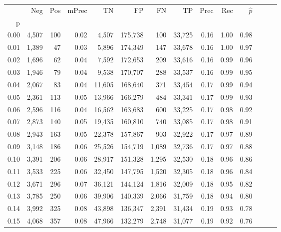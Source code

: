 \begin{tabular}{rrrrrrrrrrrrrr}
\toprule
{} &    Neg &  Pos & mPrec &       TN &       FP &      FN &      TP &  Prec &   Rec & $\hat{p}$ \\
p    &        &      &       &          &          &         &         &       &       &           \\
\midrule
0.00 &  4,507 &  100 &  0.02 &    4,507 &  175,738 &     100 &  33,725 &  0.16 &  1.00 &      0.98 \\
0.01 &  1,389 &   47 &  0.03 &    5,896 &  174,349 &     147 &  33,678 &  0.16 &  1.00 &      0.97 \\
0.02 &  1,696 &   62 &  0.04 &    7,592 &  172,653 &     209 &  33,616 &  0.16 &  0.99 &      0.96 \\
0.03 &  1,946 &   79 &  0.04 &    9,538 &  170,707 &     288 &  33,537 &  0.16 &  0.99 &      0.95 \\
0.04 &  2,067 &   83 &  0.04 &   11,605 &  168,640 &     371 &  33,454 &  0.17 &  0.99 &      0.94 \\
0.05 &  2,361 &  113 &  0.05 &   13,966 &  166,279 &     484 &  33,341 &  0.17 &  0.99 &      0.93 \\
0.06 &  2,596 &  116 &  0.04 &   16,562 &  163,683 &     600 &  33,225 &  0.17 &  0.98 &      0.92 \\
0.07 &  2,873 &  140 &  0.05 &   19,435 &  160,810 &     740 &  33,085 &  0.17 &  0.98 &      0.91 \\
0.08 &  2,943 &  163 &  0.05 &   22,378 &  157,867 &     903 &  32,922 &  0.17 &  0.97 &      0.89 \\
0.09 &  3,148 &  186 &  0.06 &   25,526 &  154,719 &   1,089 &  32,736 &  0.17 &  0.97 &      0.88 \\
0.10 &  3,391 &  206 &  0.06 &   28,917 &  151,328 &   1,295 &  32,530 &  0.18 &  0.96 &      0.86 \\
0.11 &  3,533 &  225 &  0.06 &   32,450 &  147,795 &   1,520 &  32,305 &  0.18 &  0.96 &      0.84 \\
0.12 &  3,671 &  296 &  0.07 &   36,121 &  144,124 &   1,816 &  32,009 &  0.18 &  0.95 &      0.82 \\
0.13 &  3,785 &  250 &  0.06 &   39,906 &  140,339 &   2,066 &  31,759 &  0.18 &  0.94 &      0.80 \\
0.14 &  3,992 &  325 &  0.08 &   43,898 &  136,347 &   2,391 &  31,434 &  0.19 &  0.93 &      0.78 \\
0.15 &  4,068 &  357 &  0.08 &   47,966 &  132,279 &   2,748 &  31,077 &  0.19 &  0.92 &      0.76 \\

\end{tabular}
